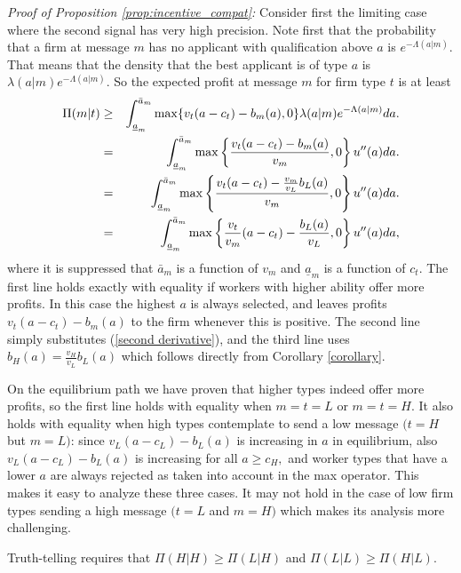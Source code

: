 \documentclass[12pt]{article}
\begin{document}
\noindent \textit{Proof of Proposition \ref{prop:incentive_compat}:} Consider first the limiting case where the second signal has very high precision.
Note first that the probability that a firm at message $m$ has no applicant with qualification above $a$ is $%
e^{-\Lambda (a|m)}.$ That means that the density that the best applicant is of type $a$ is $\lambda (a|m)e^{-\Lambda (a|m)}$. So the expected profit at message $m$ for
firm type $t$ is at least%
\begin{eqnarray}
\Pi (m|t) &\geq &\int_{\underline{a}_{m}}^{\bar{a}_{m}}\max
\{v_{t}(a-c_{t})-b_{m}(a),0\}\lambda (a|m)e^{-\Lambda (a|m)}da.  \notag \\
&=&\int_{\underline{a}_{m}}^{\bar{a}_{m}}\max \left\{ \frac{%
v_{t}(a-c_{t})-b_{m}(a)}{v_{m}},0\right\} u^{\prime \prime }(a)da.
\label{truth-start} \\
&=&\int_{\underline{a}_{m}}^{\bar{a}_{m}}\max \left\{ \frac{v_{t}(a-c_{t})-%
\frac{v_{m}}{v_{L}}b_{L}(a)}{v_{m}},0\right\} u^{\prime \prime }(a)da. 
\notag \\
&=&\int_{\underline{a}_{m}}^{\bar{a}_{m}}\max \left\{ \frac{v_{t}}{v_{m}}%
(a-c_{t})-\frac{b_{L}(a)}{v_{L}},0\right\} u^{\prime \prime }(a)da,  \notag
\end{eqnarray}%
where it is suppressed that $\bar{a}_{m}$ is a function of $v_{m}$ and $%
\underline{a}_{m}$ is a function of $c_{t}.$ The first line holds exactly
with equality if workers with higher ability offer more profits. In this
case the highest $a$ is always selected, and leaves profits $%
v_{t}(a-c_{t})-b_{m}(a)$ to the firm whenever this is positive. The second
line simply substitutes (\ref{second derivative}), and the third line uses $%
b_{H}(a)=\frac{v_{H}}{v_{L}}b_{L}(a)$ which follows directly from Corollary %
\ref{corollary}.

On the equilibrium path we have proven that higher types indeed offer more
profits, so the first line holds with equality when $m=t=L$ or $m=t=H.$ It
also holds with equality when high types contemplate to send a low message $%
(t=H$ but $m=L)$: since $v_{L}(a-c_{L})-b_{L}(a)$ is increasing in $a$ in
equilibrium, also $v_{L}(a-c_{L})-b_{L}(a)$ is increasing for all $a\geq
c_{H},$ and worker types that have a lower $a$ are always rejected as taken
into account in the max operator. This makes it easy to analyze these three
cases. It may not hold in the case of low firm types sending a high message $%
(t=L$ and $m=H)$ which makes its analysis more challenging.

Truth-telling requires that $\Pi (H|H)\geq \Pi (L|H)$ and $\Pi (L|L)\geq \Pi
(H|L).$
\end{document}
